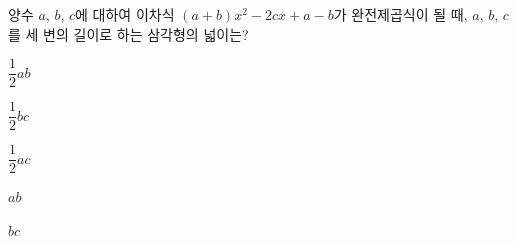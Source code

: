 양수 $a$, $b$, $c$에 대하여 이차식 $(a+b)x^2-2cx+a-b$가 완전제곱식이 될 때, $a$, $b$, $c$를 세 변의 길이로 하는 삼각형의 넓이는?
\begin{choices32}{\rule[-3ex]{0pt}{8ex}$\dfrac{1}{2}ab$}{\rule[-3ex]{0pt}{8ex}$\dfrac{1}{2}bc$}{\rule[-3ex]{0pt}{8ex}$\dfrac{1}{2}ac$}{\rule[-3ex]{0pt}{8ex}$ab$}{\rule[-3ex]{0pt}{8ex}$bc$}\end{choices32}
